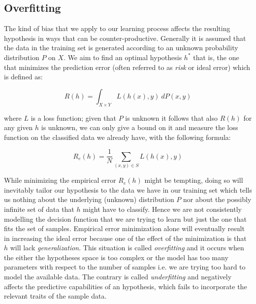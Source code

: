 \subsection{Overfitting}
The kind of bias that we apply to our learning process affects the resulting
hypothesis in ways that can be counter-productive.
Generally it is assumed that the data in the training set is generated according
to an unknown probability distribution $P$ on $X$.
We aim to find an optimal hypothesis $h^*$ that is, the one that minimizes the
prediction error (often referred to as \emph{risk} or ideal error) which is
defined as:

\[R(h)=\int_{X\times Y} L(h(x),y)~dP(x,y)\]

where $L$ is a loss function; given that $P$ is unknown it follows that also
$R(h)$ for any given $h$ is unknown, we can only give a bound on it and measure
the loss function on the classified data we already have, with the following
formula:

\[R_e(h)=\frac{1}{N} \sum_{(x,y) \in S} L(h(x),y)\]

While minimizing the empirical error $R_e(h)$ might be tempting, doing so will
inevitably tailor our hypothesis to the data we have in our training set which
tells us nothing about the underlying (unknown) distribution $P$ nor about the 
possibly infinite set of data that $h$ might have to classify.
Hence we are not consistently modelling the decision function that we are trying
to learn but just the one that fits the set of samples.
Empirical error minimization alone will eventually result in increasing the ideal
error because one of the effect of the minimization is that $h$ will lack
\emph{generalization}.
This situation is called \emph{overfitting} and it occurs when the either the
hypotheses space is too complex or the model has too many parameters with
respect to the number of samples i.e. we are trying too hard to model the
available data.
The contrary is called \emph{underfitting} and negatively affects the
predictive capabilities of an hypothesis, which fails to incorporate the relevant
traits of the sample data.

